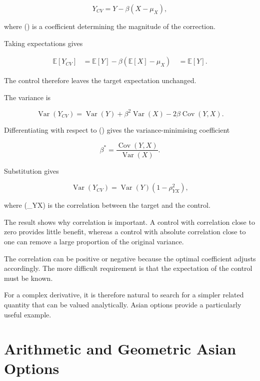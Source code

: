 \documentclass[12pt,a4paper]{report}
\begin{document}
\begin{equation}
Y_{CV}
=
Y
-
\beta
(X-\mu_X),
\end{equation}

where (\beta) is a coefficient determining the magnitude of the correction.

Taking expectations gives

\begin{align}
\mathbb{E}[Y_{CV}]
&=
\mathbb{E}[Y]
-
\beta
\left(
\mathbb{E}[X]-\mu_X
\right)
\
&=
\mathbb{E}[Y].
\end{align}

The control therefore leaves the target expectation unchanged.

The variance is

\begin{equation}
\operatorname{Var}(Y_{CV})
=
\operatorname{Var}(Y)
+
\beta^2\operatorname{Var}(X)
-
2\beta\operatorname{Cov}(Y,X).
\end{equation}

Differentiating with respect to (\beta) gives the variance-minimising coefficient

\begin{equation}
\beta^*
=
\frac{
\operatorname{Cov}(Y,X)
}{
\operatorname{Var}(X)
}.
\end{equation}

Substitution gives

\begin{equation}
\operatorname{Var}(Y_{CV})
=
\operatorname{Var}(Y)
(1-\rho_{YX}^{2}),
\end{equation}

where (\rho_{YX}) is the correlation between the target and the control.

The result shows why correlation is important. A control with correlation close to zero provides little benefit, whereas a control with absolute correlation close to one can remove a large proportion of the original variance.

The correlation can be positive or negative because the optimal coefficient adjusts accordingly. The more difficult requirement is that the expectation of the control must be known.

For a complex derivative, it is therefore natural to search for a simpler related quantity that can be valued analytically. Asian options provide a particularly useful example.

\section{Arithmetic and Geometric Asian Options}
\end{document}
